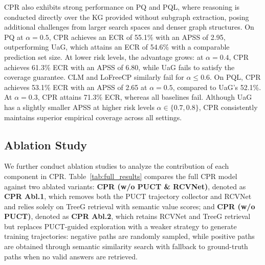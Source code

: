 \documentclass{article}
\theoremstyle{plain}
\theoremstyle{definition}
\theoremstyle{remark}
\begin{document}

CPR also exhibits strong performance on PQ and PQL, where reasoning is conducted directly over the KG provided without subgraph extraction, posing additional challenges from larger search spaces and denser graph structures. On PQ at $\alpha=0.5$, CPR achieves an ECR of 55.1\% with an APSS of 2.95, outperforming UaG, which attains an ECR of 54.6\% with a comparable prediction set size. At lower risk levels, the advantage grows: at $\alpha=0.4$, CPR achieves 61.3\% ECR with an APSS of 6.80, while UaG fails to satisfy the coverage guarantee. CLM and LoFreeCP similarly fail for $\alpha \leq 0.6$. On PQL, CPR achieves 53.1\% ECR with an APSS of 2.65 at $\alpha=0.5$, compared to UaG's 52.1\%. At $\alpha=0.3$, CPR attains 71.3\% ECR, whereas all baselines fail. Although UaG has a slightly smaller APSS at higher risk levels $\alpha \in \{0.7,0.8\}$, CPR consistently maintains superior empirical coverage across all settings.

\subsection{Ablation Study}
We further conduct ablation studies to analyze the contribution of each component in CPR. Table~\ref{tab:full_results} compares the full CPR model against two ablated variants: 
\textbf{CPR (w/o PUCT \& RCVNet)}, denoted as \textbf{CPR Abl.1}, which removes both the PUCT trajectory collector and RCVNet and relies solely on TreeG retrieval with semantic value scores; and \textbf{CPR (w/o PUCT)}, denoted as \textbf{CPR Abl.2}, which  retains RCVNet and TreeG retrieval but replaces PUCT-guided exploration with a weaker strategy to generate training trajectories: negative paths are randomly sampled, while positive paths are obtained through semantic similarity search with fallback to ground-truth paths when no valid answers are retrieved.
\end{document}
